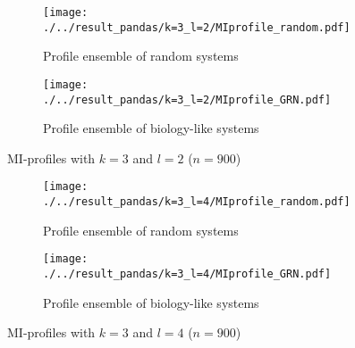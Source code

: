 \documentclass[../main.tex]{subfiles}
\begin{document}
\begin{figure}[H]
    \centering
    \begin{subfigure}[b]{0.4\textwidth}
        \texttt{[image: ./../result\_pandas/k=3\_l=2/MIprofile\_random.pdf]}
        \caption{Profile ensemble of random systems}
    \end{subfigure}
    \begin{subfigure}[b]{0.4\textwidth}
        \texttt{[image: ./../result\_pandas/k=3\_l=2/MIprofile\_GRN.pdf]}
        \caption{Profile ensemble of biology-like systems}
    \end{subfigure}
    \caption{MI-profiles with $k=3$ and $l=2$ ($n=900$)}
    \label{fig:profilel2}
\end{figure}

\begin{figure}[H]
    \centering
    \begin{subfigure}[b]{0.4\textwidth}
        \texttt{[image: ./../result\_pandas/k=3\_l=4/MIprofile\_random.pdf]}
        \caption{Profile ensemble of random systems}
    \end{subfigure}
    \begin{subfigure}[b]{0.4\textwidth}
        \texttt{[image: ./../result\_pandas/k=3\_l=4/MIprofile\_GRN.pdf]}
        \caption{Profile ensemble of biology-like systems}
    \end{subfigure}
    \caption{MI-profiles with $k=3$ and $l=4$ ($n=900$)}
    \label{fig:profilel4}
\end{figure}


\end{document}
